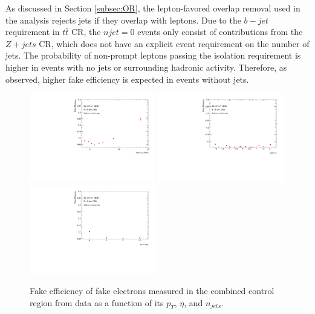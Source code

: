 As discussed in Section \ref{subsec:OR}, the lepton-favored overlap removal used in the analysis rejects jets if they overlap with leptons. Due to the $b-jet$ requirement in $t\bar{t}$ CR, the $njet=0$ events only consist of contributions from the $Z+jets$ CR, which does not have an explicit event requirement on the number of jets. The probability of non-prompt leptons passing the isolation requirement is higher in events with no jets or surrounding hadronic activity. Therefore, as observed, higher fake efficiency is expected in events without jets.  

\begin{figure}[!htb]
        \begin{center}
        \includegraphics[width = 0.49\textwidth]{figures/Analysis/Background/Fake_Eff_Elec_pt_1D.pdf}
        \includegraphics[width = 0.49\textwidth]{figures/Analysis/Background/Fake_Eff_Elec_eta_1D.pdf}\\
        \includegraphics[width = 0.49\textwidth]{figures/Analysis/Background/Fake_Eff_Elec_jet_n_1D.pdf} 
        \end{center}
    \caption{Fake efficiency of fake electrons measured in the combined control region from data as a function of its $p_{T}$, $\eta$, and $n_{jets}$.\label{fig:FakeEff_1D_Electron}}
\end{figure}

